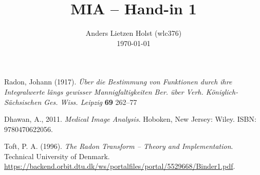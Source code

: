 \documentclass[a4paper,12pt]{article}
\title{\large MIA -- Hand-in 1}
\author{{\footnotesize Anders Lietzen Holst (wlc376)}\\ {\footnotesize \today}}
\date{}
\begin{document}


\maketitle





\begin{thebibliography}{8}
  Radon, Johann (1917). \textit{Über die Bestimmung von Funktionen durch ihre Integralwerte längs gewisser
    Mannigfaltigkeiten Ber. über Verh. Königlich-Sächsischen Ges. Wiss. Leipzig}
    \textbf{69} 262–77

  Dhawan, A., 2011. \textit{Medical Image Analysis}. Hoboken, New Jersey: Wiley.
    ISBN: 9780470622056.

  Toft, P. A. (1996). \textit{The Radon Transform -- Theory and Implementation}.
    Technical University of Denmark.
    \url{https://backend.orbit.dtu.dk/ws/portalfiles/portal/5529668/Binder1.pdf}.

\end{thebibliography}
\end{document}
